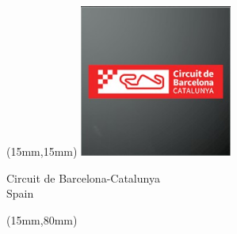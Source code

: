 \begin{textblock*}{50mm}(15mm,15mm)%
\includegraphics[width=50mm]{LG/2015-05-20_00078.png}
\par Circuit de Barcelona-Catalunya\\ Spain
\end{textblock*}
\begin{textblock*}{185mm}(15mm,80mm)%
\end{textblock*}
